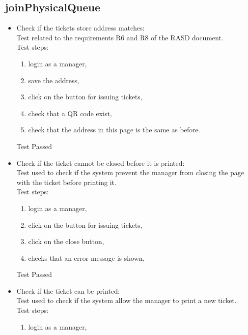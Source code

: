 \subsection{joinPhysicalQueue}

\begin{itemize}
    \item Check if the tickets store address matches: \\
    Test related to the requirements R6 and R8 of the RASD document. \\
    Test steps: \\
    \begin{enumerate}

        \item login as a manager,

        \item save the address,

        \item click on the button for issuing tickets,

        \item check that a QR code exist,

        \item check that the address in this page is the same as before.
    \end{enumerate}
    Test Passed

    \item Check if the ticket cannot be closed before it is printed: \\
    Test used to check if the system prevent the manager from closing the page with the ticket before printing it. \\
    Test steps: \\
    \begin{enumerate}
        \item login as a manager,

        \item click on the button for issuing tickets,

        \item click on the close button,

        \item checks that an error message is shown.
    \end{enumerate}
    Test Passed \\

    \item Check if the ticket can be printed: \\
    Test used to check if the system allow the manager to print a new ticket. \\
    Test steps:\\
    \begin{enumerate}
        \item login as a manager,


\end{enumerate}
\end{itemize}
